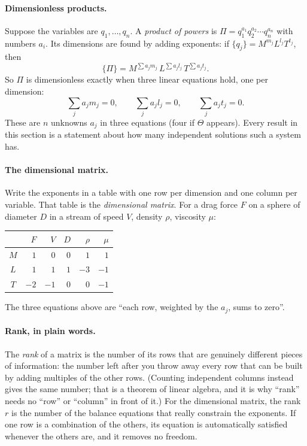 \paragraph{Dimensionless products.} Suppose the variables are $q_1, \dots, q_n$. A \emph{product of powers} is $\Pi = q_1^{a_1} q_2^{a_2} \cdots q_n^{a_n}$ with numbers $a_i$. Its dimensions are found by adding exponents: if $\{q_j\} = M^{m_j} L^{l_j} T^{t_j}$, then
\[
\{\Pi\} = M^{\sum a_j m_j}\, L^{\sum a_j l_j}\, T^{\sum a_j t_j}.
\]
So $\Pi$ is dimensionless exactly when three linear equations hold, one per dimension:
\[
\sum_j a_j m_j = 0, \qquad \sum_j a_j l_j = 0, \qquad \sum_j a_j t_j = 0.
\]
These are $n$ unknowns $a_j$ in three equations (four if $\Theta$ appears). Every result in this section is a statement about how many independent solutions such a system has.

\paragraph{The dimensional matrix.} Write the exponents in a table with one row per dimension and one column per variable. That table is the \emph{dimensional matrix}. For a drag force $F$ on a sphere of diameter $D$ in a stream of speed $V$, density $\rho$, viscosity $\mu$:
\begin{center}\small
\begin{tabular}{c|rrrrr}
 & $F$ & $V$ & $D$ & $\rho$ & $\mu$ \\
\midrule
$M$ & $1$ & $0$ & $0$ & $1$ & $1$ \\
$L$ & $1$ & $1$ & $1$ & $-3$ & $-1$ \\
$T$ & $-2$ & $-1$ & $0$ & $0$ & $-1$ \\
\end{tabular}
\end{center}
The three equations above are ``each row, weighted by the $a_j$, sums to zero''.

\paragraph{Rank, in plain words.} The \emph{rank} of a matrix is the number of its rows that are genuinely different pieces of information: the number left after you throw away every row that can be built by adding multiples of the other rows. (Counting independent columns instead gives the same number; that is a theorem of linear algebra, and it is why ``rank'' needs no ``row'' or ``column'' in front of it.) For the dimensional matrix, the rank $r$ is the number of the balance equations that really constrain the exponents. If one row is a combination of the others, its equation is automatically satisfied whenever the others are, and it removes no freedom.

